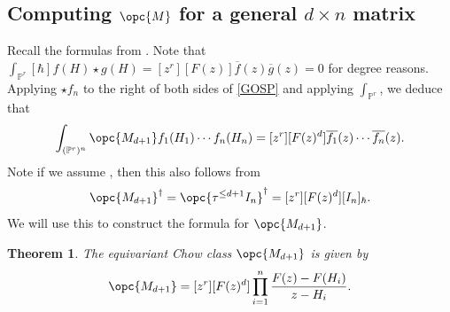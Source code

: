 \documentclass[12pt]{amsart}
\newcommand{\mb}{\mathbb}
\newcommand{\ol}{\overline}
\theoremstyle{plain}
\newtheorem{Thm}{Theorem}[section]
\theoremstyle{definition}
\theoremstyle{remark}
\begin{document}

\subsection{Computing $\opc{M}$ for a general $d \times n$ matrix}Recall the formulas from .
Note that $\int_{\mb{P}^r}[\hbar]f(H)\star g(H)=[z^r][F(z)]\overline{f}(z)\overline{g}(z)=0$ for degree reasons. Applying $\star f_n$ to the right of both sides of \cref{GOSP} and applying $\int_{\mb{P}^r}$, we deduce that \[\int_{(\mb{P}^r)^n}\opc{M_{d+1}}f_1(H_1) \cdots f_n(H_n)=[z^r][F(z)^{d}]\overline{f_1}(z)\cdots \overline{f_n}(z).\] Note if we assume , then this also follows from
$$\opc{M_{d+1}}^{\dagger}=\opc{\tau^{\le d+1}I_{n}}^{\dagger}=[z^r][F(z)^{d}][I_{n}]_{\hbar}.$$
We will use this to construct the formula for $\opc{M_{d+1}}$.
\begin{Thm} \label{opcmd}
The equivariant Chow class $\opc{M_{d+1}}$ is given by
\begin{align*}
\opc{M_{d+1}}=[z^r][F(z)^{d}]\prod_{i=1}^n \frac{F(z)-F(H_i)}{z-H_i}.
\end{align*}
\end{Thm}
\end{document}
